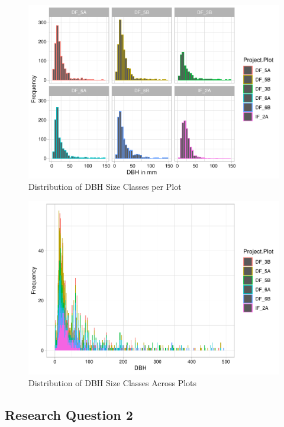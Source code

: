 \documentclass[
  12pt,
]{article}
\begin{document}
\begin{figure}
\centering
\includegraphics{GoldenGriffithsKnierMalinowski_ENV872_Project_files/figure-latex/unnamed-chunk-5-1.pdf}
\caption{Distribution of DBH Size Classes per Plot}
\end{figure}

\begin{figure}
\centering
\includegraphics{GoldenGriffithsKnierMalinowski_ENV872_Project_files/figure-latex/unnamed-chunk-7-1.pdf}
\caption{Distribution of DBH Size Classes Across Plots}
\end{figure}

\hypertarget{research-question-2-1}{%
\subsection{Research Question 2}\label{research-question-2-1}}
\end{document}
